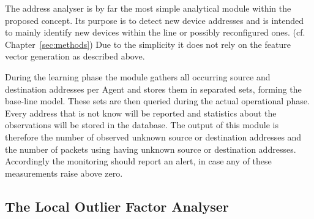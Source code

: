 The address analyser is by far the most simple analytical module within the proposed concept.
Its purpose is to detect new device addresses and is intended to mainly identify new devices within the line or possibly reconfigured ones. (cf. Chapter~\ref{sec:methods})
Due to the simplicity it does not rely on the feature vector generation as described above.

During the learning phase the module gathers all occurring source and destination addresses per Agent and stores them in separated sets, forming the base-line model.
These sets are then queried during the actual operational phase. Every address that is not know will be reported and statistics about the observations will be stored in the database.
The output of this module is therefore the number of observed unknown source or destination addresses and the number of packets using having unknown source or destination addresses.
Accordingly the monitoring should report an alert, in case any of these measurements raise above zero.

\subsection{The Local Outlier Factor Analyser}
\label{sec:concept:anal:lof}

